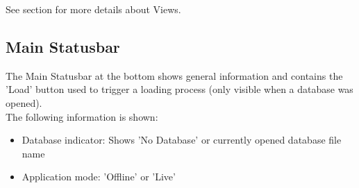 See section  for more details about Views.

\subsection{Main Statusbar}
\label{sec:ui_main_status_bar}

The Main Statusbar at the bottom shows general information and contains the 'Load' button used to trigger a loading process (only visible when a database was opened). \\

The following information is shown:

\begin{itemize}
 \item Database indicator: Shows 'No Database' or currently opened database file name
 \item Application mode: 'Offline' or 'Live'
\end{itemize}
\  \\
